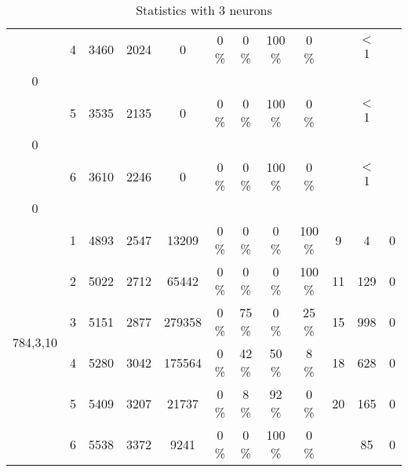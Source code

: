 \begin{table} [!ht]
\begin{tabular}{ ||c||c|c|c|c|c|c|c|c|c|c|c| }
& 4 & 3460 & 2024 & 0 & 0 \% & 0 \% & 100 \% & 0 \% &  & $<$1 \\ 0 \\ 
& 5 & 3535 & 2135 & 0 & 0 \% & 0 \% & 100 \% & 0 \% &  & $<$1 \\ 0 \\ 
& 6 & 3610 & 2246 & 0 & 0 \% & 0 \% & 100 \% & 0 \% &  & $<$1 \\ 0 \\ 
\hline \hline
\multirow{6}{4em}{784,3,10}
& 1 & 4893 & 2547 & 13209 & 0 \% & 0 \% & 0 \% & 100 \% & 9 & 4 & 0 \\ 
& 2 & 5022 & 2712 & 65442 & 0 \% & 0 \% & 0 \% & 100 \% & 11 & 129 & 0 \\ 
& 3 & 5151 & 2877 & 279358 & 0 \% & 75 \% & 0 \% & 25 \% & 15 & 998 & 0 \\ 
& 4 & 5280 & 3042 & 175564 & 0 \% & 42 \% & 50 \% & 8 \% & 18 & 628 & 0 \\ 
& 5 & 5409 & 3207 & 21737 & 0 \% & 8 \% & 92 \% & 0 \% & 20 & 165 & 0 \\ 
& 6 & 5538 & 3372 & 9241 & 0 \% & 0 \% & 100 \% & 0 \% &  & 85 & 0 \\ 
\hline \hline
\end{tabular} \caption{Statistics with 3 neurons}\label{tab:3N-E2} \end{table}
